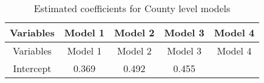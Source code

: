 \documentclass[12pt,twoside]{reedthesis}
\begin{document}
  \begin{longtable}[]{@{}ccccc@{}}
  \caption{Estimated coefficients for County level models
  \label{tab:model_county_coefs}}\tabularnewline
  \toprule
  \begin{minipage}[b]{0.26\columnwidth}\centering\strut
  Variables\strut
  \end{minipage} & \begin{minipage}[b]{0.12\columnwidth}\centering\strut
  Model 1\strut
  \end{minipage} & \begin{minipage}[b]{0.12\columnwidth}\centering\strut
  Model 2\strut
  \end{minipage} & \begin{minipage}[b]{0.12\columnwidth}\centering\strut
  Model 3\strut
  \end{minipage} & \begin{minipage}[b]{0.12\columnwidth}\centering\strut
  Model 4\strut
  \end{minipage}\tabularnewline
  \midrule
  \endfirsthead
  \toprule
  \begin{minipage}[b]{0.26\columnwidth}\centering\strut
  Variables\strut
  \end{minipage} & \begin{minipage}[b]{0.12\columnwidth}\centering\strut
  Model 1\strut
  \end{minipage} & \begin{minipage}[b]{0.12\columnwidth}\centering\strut
  Model 2\strut
  \end{minipage} & \begin{minipage}[b]{0.12\columnwidth}\centering\strut
  Model 3\strut
  \end{minipage} & \begin{minipage}[b]{0.12\columnwidth}\centering\strut
  Model 4\strut
  \end{minipage}\tabularnewline
  \midrule
  \endhead
  \begin{minipage}[t]{0.26\columnwidth}\centering\strut
  Intercept\strut
  \end{minipage} & \begin{minipage}[t]{0.12\columnwidth}\centering\strut
  0.369\strut
  \end{minipage} & \begin{minipage}[t]{0.12\columnwidth}\centering\strut
  0.492\strut
  \end{minipage} & \begin{minipage}[t]{0.12\columnwidth}\centering\strut
  0.455\strut
  \end{minipage} & \begin{minipage}[t]{0.12\columnwidth}\centering\strut

\end{minipage}
\end{longtable}
\end{document}
